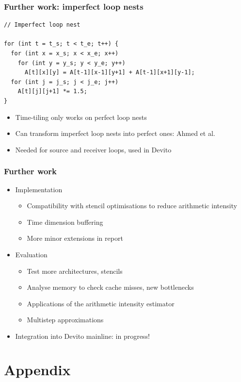 \documentclass{beamer}
\begin{document}
\begin{frame}[fragile]
\frametitle{Further work: imperfect loop nests}

\begin{lstlisting}
// Imperfect loop nest

for (int t = t_s; t < t_e; t++) {
  for (int x = x_s; x < x_e; x++)
    for (int y = y_s; y < y_e; y++)
      A[t][x][y] = A[t-1][x-1][y+1] + A[t-1][x+1][y-1];
  for (int j = j_s; j < j_e; j++)
    A[t][j][j+1] *= 1.5;
}
\end{lstlisting}

\begin{itemize}
	\item Time-tiling only works on perfect loop nests
	\item Can transform imperfect loop nests into perfect ones: Ahmed et al.
	\item Needed for source and receiver loops, used in Devito
\end{itemize}
\end{frame}



\begin{frame}
\frametitle{Further work}

\begin{itemize}
	\item Implementation
	\begin{itemize}
		\item Compatibility with stencil optimisations to reduce arithmetic intensity
		\item Time dimension buffering
		\item More minor extensions in report
	\end{itemize}
	\item Evaluation
	\begin{itemize}
		\item Test more architectures, stencils
		\item Analyse memory to check cache misses, new bottlenecks
		\item Applications of the arithmetic intensity estimator
		\item Multistep approximations
	\end{itemize}
	\item Integration into Devito mainline: in progress!
\end{itemize}
\end{frame}



\section{Appendix}
\end{document}
